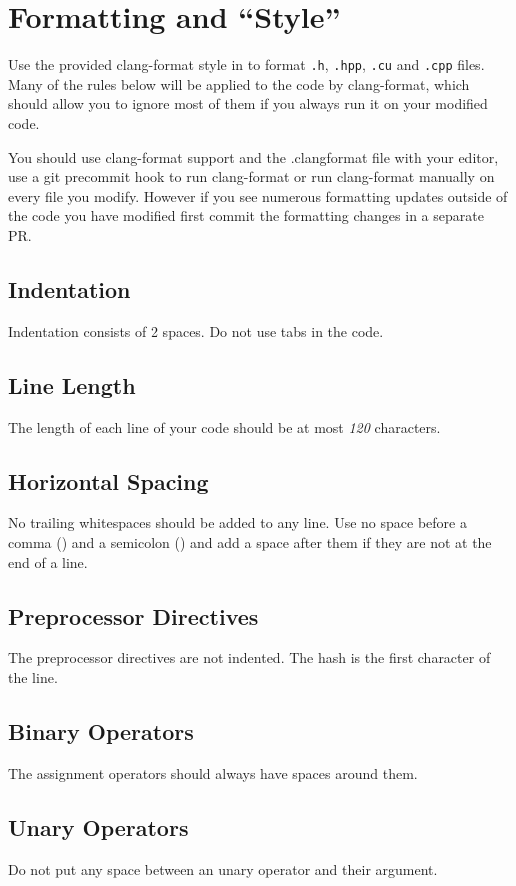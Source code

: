 \section{Formatting and ``Style''}
Use the provided clang-format style in  to format \verb|.h|, \verb|.hpp|, \verb|.cu| and \verb|.cpp| files. Many of the rules below will be applied to the code by clang-format, which should allow you to ignore most of them if you always run it on your modified code.

You should use clang-format support and the .clangformat file with your editor, use a git precommit hook to run clang-format or run clang-format manually on every file you modify.  However if you see numerous formatting updates outside of the code you have modified first commit the formatting changes in a separate PR.

\subsection{Indentation}
Indentation consists of 2 spaces.
Do not use tabs in the code.

\subsection{Line Length}
The length of each line of your code should be at most \emph{120} characters.

\subsection{Horizontal Spacing}
No trailing whitespaces should be added to any line.
Use no space before a comma (\inlinecode{,}) and a semicolon (\inlinecode{;}) and add a space after them if they are not at the end of a line.

\subsection{Preprocessor Directives}
The preprocessor directives are not indented.
The hash is the first character of the line.

\subsection{Binary Operators}
The assignment operators should always have spaces around them.

\subsection{Unary Operators}
Do not put any space between an unary operator and their argument.

